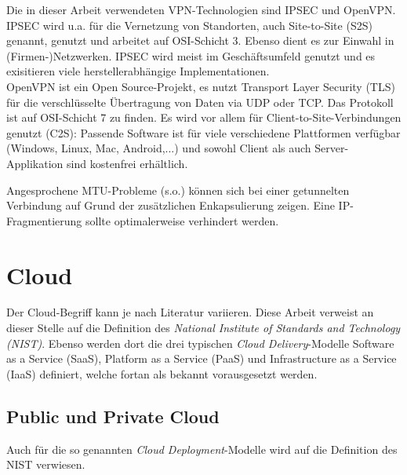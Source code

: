 Die in dieser Arbeit verwendeten VPN-Technologien sind IPSEC und OpenVPN. IPSEC wird u.a. für die Vernetzung von Standorten, auch Site-to-Site (S2S) genannt, genutzt und arbeitet auf OSI-Schicht 3. Ebenso dient es zur \glqq Einwahl\grqq{} in (Firmen-)Netzwerken.  IPSEC wird meist im Geschäftsumfeld genutzt und es exisitieren viele herstellerabhängige Implementationen.\\
OpenVPN ist ein Open Source-Projekt, es nutzt Transport Layer Security (TLS) für die verschlüsselte Übertragung von Daten via UDP oder TCP. Das Protokoll ist auf OSI-Schicht 7 zu finden. Es wird vor allem für Client-to-Site-Verbindungen genutzt (C2S): Passende Software ist für viele verschiedene Plattformen verfügbar (Windows, Linux, Mac, Android,...) und sowohl Client als auch Server-Applikation sind kostenfrei erhältlich.

Angesprochene MTU-Probleme (s.o.) können sich bei einer getunnelten Verbindung auf Grund der zusätzlichen Enkapsulierung zeigen. Eine IP-Fragmentierung sollte optimalerweise verhindert werden.

\section{Cloud}\label{cloud}
Der Cloud-Begriff kann je nach Literatur variieren. Diese Arbeit verweist an dieser Stelle auf die Definition des \textit{National Institute of Standards and Technology (NIST)}. Ebenso werden dort die drei typischen \textit{Cloud Delivery}-Modelle Software as a Service (SaaS), Platform as a Service (PaaS) und Infrastructure as a Service (IaaS) definiert, welche fortan als bekannt vorausgesetzt werden.\cite{mell2011}

\subsection{Public und Private Cloud}

Auch für die so genannten \textit{Cloud Deployment}-Modelle wird auf die Definition des NIST verwiesen.\cite{mell2011}

